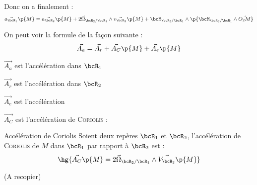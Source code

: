     Donc on a finalement :
    \[ \vec{a_{\bcR_1}}\p{M} = \vec{a_{\bcR_2}}\p{M} + 2\vec \Omega_{\bcR_2/\bcR_1} \wedge \vec{v_{\bcR_2}}\p{M} +  \bcM_{\bcR_2/\bcR_1} \wedge \p{ \bcM_{\bcR_2/\bcR_1} \wedge \vec{O_2M}}\]
    
    On peut voir la formule de la façon suivante :
    \[ \vec{A_a} = \vec{A_r} + \vec{A_C}\p{M} + \vec{A_e}\p{M}\]
    \begin{enumerate}
        \itt $\vec{A_a}$ est l'accélération  dans $\bcR_1$
        
        \itt $\vec{A_r}$ est l'accélération  dans $\bcR_2$
        
        \itt $\vec{A_e}$ est l'accélération 
        
        \itt $\vec{A_C}$ est l'accélération de \textsc{Coriolis} :
    \end{enumerate}
    
    \begin{definition}{Accélération de Coriolis}{}
        Soient deux repères $\bcR_1$ et $\bcR_2$, l'accélération de \textsc{Coriolis} de $M$ dans $\bcR_1$ par rapport à $\bcR_2$ est :
        \[ \hg{\vec{A_C}\p{M} = 2\vec \Omega_{\bcR_2/\bcR_1} \wedge \vec{V_{\bcR_2}}\p{M}}\]
    \end{definition}
    
    (A recopier)
    
    \newpage
    
